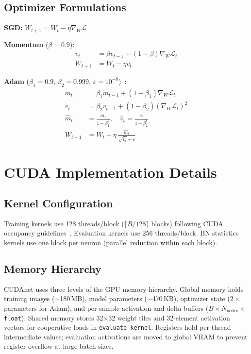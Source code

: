 \documentclass[conference]{IEEEtran}
\begin{document}
\subsection{Optimizer Formulations}

\textbf{SGD:} $W_{t+1} = W_t - \eta \nabla_W \mathcal{L}$

\textbf{Momentum} ($\beta=0.9$):
\begin{align}
v_t &= \beta v_{t-1} + (1-\beta)\nabla_W \mathcal{L}_t \\
W_{t+1} &= W_t - \eta v_t
\end{align}

\textbf{Adam} ($\beta_1=0.9,\,\beta_2=0.999,\,\varepsilon=10^{-8}$)~\cite{b7}:
\begin{align}
m_t &= \beta_1 m_{t-1} + (1-\beta_1)\nabla_W \mathcal{L}_t \\
v_t &= \beta_2 v_{t-1} + (1-\beta_2)(\nabla_W \mathcal{L}_t)^2 \\
\hat{m}_t &= \frac{m_t}{1-\beta_1^t},\quad \hat{v}_t = \frac{v_t}{1-\beta_2^t} \\
W_{t+1} &= W_t - \eta\,\frac{\hat{m}_t}{\sqrt{\hat{v}_t}+\varepsilon}
\end{align}

\section{CUDA Implementation Details}

\subsection{Kernel Configuration}

Training kernels use 128 threads/block ($\lceil B/128 \rceil$ blocks) following CUDA occupancy guidelines~\cite{b2}. Evaluation kernels use 256 threads/block. BN statistics kernels use one block per neuron (parallel reduction within each block).

\subsection{Memory Hierarchy}

CUDAnet uses three levels of the GPU memory hierarchy. Global memory holds training images ($\sim$180\,MB), model parameters ($\sim$470\,KB), optimizer state ($2\times$ parameters for Adam), and per-sample activation and delta buffers ($B \times N_\text{nodes} \times$\texttt{float}). Shared memory stores 32$\times$32 weight tiles and 32-element activation vectors for cooperative loads in \texttt{evaluate\_kernel}. Registers hold per-thread intermediate values; evaluation activations are moved to global VRAM to prevent register overflow at large batch sizes.
\end{document}

